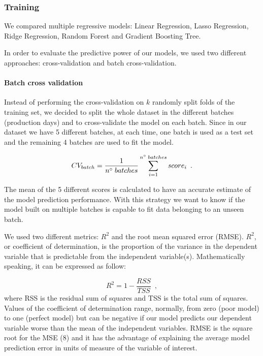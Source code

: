 \subsubsection{Training}

We compared multiple regressive models: Linear Regression, Lasso Regression, Ridge Regression, Random Forest and Gradient Boosting Tree. 

In order to evaluate the predictive power of our models, we used two different approaches: cross-validation and batch cross-validation. 

\paragraph{Batch cross validation}
Instead of performing the cross-validation on $k$ randomly split folds of the training set, we decided to split the whole dataset in the different batches (production days) and to cross-validate the model on each batch. Since in our dataset we have 5 different batches, at each time, one batch is used as a test set and the remaining 4 batches are used to fit the model.

\begin{equation}
    CV_{batch} = \frac{1}{n\degree\;batches}\sum_{i=1}^{n\degree\;batches}score_{i}
    \enspace.
\end{equation}

The mean of the 5 different scores is calculated to have an accurate estimate of the model prediction performance. With this strategy we want to know if the model built on multiple batches is capable to fit data belonging to an unseen batch.  

We used two different metrics: $R^2$ and the root mean squared error (RMSE). $R^2$, or coefficient of determination, is the proportion of the variance in the dependent variable that is predictable from the independent variable(s). Mathematically speaking, it can be expressed as follow:

\begin{equation}
    R^2 = 1 - \frac{RSS}{TSS}
    \enspace,
\end{equation}
where RSS is the residual sum of squares and TSS is the total sum of squares.
Values of the coefficient of determination range, normally, from zero (poor model) to one (perfect model) but can be negative if our model predicts our dependent variable worse than the mean of the independent variables. RMSE is the square root for the MSE (8) and it has the advantage of explaining the average model prediction error in units of measure of the variable of interest. 


